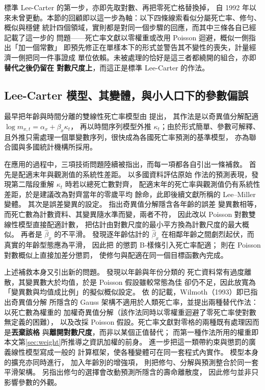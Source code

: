 \documentclass[UTF8, fontset=macnew, a4paper, 12pt]{ctexart}
\begin{document}
標準 Lee-Carter 的第一步，亦即先取對數、再把零死亡格替換掉，
自 1992 年以來未曾更動。本節的回顧即以這一步為軸：以下四條線索看似分屬死亡率、修勻、概似與穩健
統計四個領域，實則都是對同一個步驟的回應，而其中三條各自已經記載了這一步的
問題——死亡率文獻以零權重或改用 Poisson 迴避，概似一側指出「加一個常數」
即預先修正在單樣本下的形式並警告其不變性的喪失，計量經濟一側把同一件事證成
單位依賴。未被處理的恰好是這三者都繞開的組合，亦即\textbf{替代之後仍留在
對數尺度上}，而這正是標準 Lee-Carter 的作法。

\subsection{Lee-Carter 模型、其變體，與小人口下的參數偏誤}\label{subsec:lc}

最早把年齡與時間分離的雙線性死亡率模型由 \citet{lee1992} 提出，
其作法是以奇異值分解配適 $\log m_{x,t}=\alpha_x+\beta_x\kappa_t$，
再以時間序列模型外推 $\kappa_t$；由於形式簡單、參數可解釋、
且外推只需處理一個單變數序列，很快成為各國死亡率預測的基準模型，
亦為聯合國與多國統計機構所採用。

在應用的過程中，三項技術問題陸續被指出，而每一項都各自引出一條補救。
首先是配適末年與觀測值的系統性差距。\citet{leemiller2001} 以多國資料評估原始
作法的預測表現，發現第二階段重解 $\kappa_t$ 時若以總死亡數對齊，
配適末年的死亡率與觀測值仍有系統性差距，於是建議改為對齊當年的零歲平均
餘命，此即後續文獻所稱的 Lee--Miller 變體。
其次是誤差變異的設定。\citet{brouhns2002} 指出奇異值分解隱含各年齡的誤差
變異數相等，而死亡數為計數資料、其變異隨水準而變，兩者不符，
因此改以 Poisson 對數雙線性模型直接配適計數，
把估計由對數尺度的最小平方換為計數尺度的最大概似。
再者是 $\hat\beta_x$ 的不平滑。\citet{currie2004} 發現逐年齡估計的
$\hat\beta_x$ 在相鄰年齡之間劇烈起伏，而真實的年齡型態應為平滑，
因此把 \citet{eilers1996} 的懲罰 B-樣條引入死亡率配適；
\citet{delwarde2007} 則在 Poisson 對數概似上直接加差分懲罰，
使修勻與配適在同一個目標函數內完成。

上述補救本身又引出新的問題。\citet{djeundje2010} 發現以年齡與年份分類的
死亡資料常有過度離散，其變異數大於均值，於是 Poisson 假設雖較常態為佳
卻仍不足，因此放寬為「變異數與均值成比例」的擬似概似設定。
依 \citet[\S4.3]{basellini2023} 的記載，Wilmoth（1993）即已指出奇異值分解
所隱含的 Gauss 架構不適用於人類死亡率，並提出兩種替代作法：以死亡數為權重的
加權奇異值分解（該作法同時以零權重迴避了零死亡率使對數無定義的困難），
以及改採 Poisson 假設。死亡率文獻對零格的兩種既有處理因而是\textbf{丟棄該格}
與\textbf{離開對數尺度}，而非以某個正值替代；
而第一種作法所用的權重即本文第\ref{sec:weight}所推導之資訊加權的前身。
\citet{currie2013} 進一步把這一類帶約束與懲罰的廣義線性模型寫成一般的
計算框架，使各種變體可在同一套程式內實作。
模型本身的擴充亦同時進行，\citet{renshaw2003} 加入年齡別的增強項，
\citet{camarda2021} 則把修勻、分解與預測整合於同一套平滑架構。
\citet{rabbi2021} 另指出修勻的選擇會改動預測所隱含的壽命離散度，
因此修勻並非只影響參數的外觀。
\end{document}
